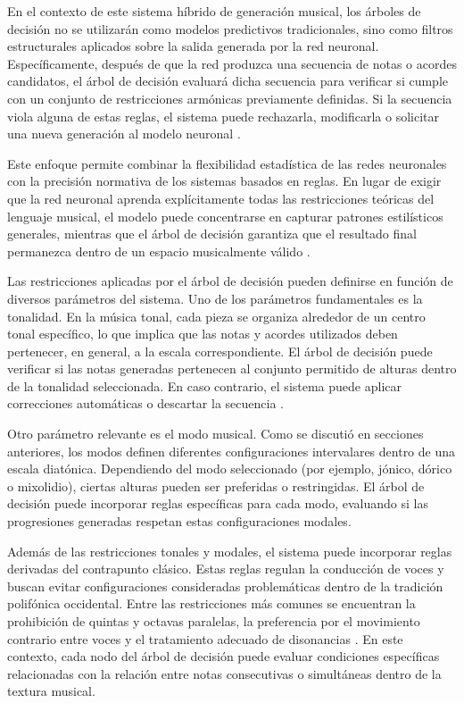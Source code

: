 \documentclass[12pt]{report}
\begin{document}
En el contexto de este sistema híbrido de generación musical, los árboles de decisión no se utilizarán como modelos predictivos tradicionales, sino como filtros estructurales aplicados sobre la salida generada por la red neuronal. Específicamente, después de que la red produzca una secuencia de notas o acordes candidatos, el árbol de decisión evaluará dicha secuencia para verificar si cumple con un conjunto de restricciones armónicas previamente definidas. Si la secuencia viola alguna de estas reglas, el sistema puede rechazarla, modificarla o solicitar una nueva generación al modelo neuronal \cite{pachet2011finite}.

Este enfoque permite combinar la flexibilidad estadística de las redes neuronales con la precisión normativa de los sistemas basados en reglas. En lugar de exigir que la red neuronal aprenda explícitamente todas las restricciones teóricas del lenguaje musical, el modelo puede concentrarse en capturar patrones estilísticos generales, mientras que el árbol de decisión garantiza que el resultado final permanezca dentro de un espacio musicalmente válido \cite{papadopoulos1999ai}.

Las restricciones aplicadas por el árbol de decisión pueden definirse en función de diversos parámetros del sistema. Uno de los parámetros fundamentales es la tonalidad. En la música tonal, cada pieza se organiza alrededor de un centro tonal específico, lo que implica que las notas y acordes utilizados deben pertenecer, en general, a la escala correspondiente. El árbol de decisión puede verificar si las notas generadas pertenecen al conjunto permitido de alturas dentro de la tonalidad seleccionada. En caso contrario, el sistema puede aplicar correcciones automáticas o descartar la secuencia \cite{lerdahl1985generative}.

Otro parámetro relevante es el modo musical. Como se discutió en secciones anteriores, los modos definen diferentes configuraciones intervalares dentro de una escala diatónica. Dependiendo del modo seleccionado (por ejemplo, jónico, dórico o mixolidio), ciertas alturas pueden ser preferidas o restringidas. El árbol de decisión puede incorporar reglas específicas para cada modo, evaluando si las progresiones generadas respetan estas configuraciones modales.

Además de las restricciones tonales y modales, el sistema puede incorporar reglas derivadas del contrapunto clásico. Estas reglas regulan la conducción de voces y buscan evitar configuraciones consideradas problemáticas dentro de la tradición polifónica occidental. Entre las restricciones más comunes se encuentran la prohibición de quintas y octavas paralelas, la preferencia por el movimiento contrario entre voces y el tratamiento adecuado de disonancias \cite{fux1965study}. En este contexto, cada nodo del árbol de decisión puede evaluar condiciones específicas relacionadas con la relación entre notas consecutivas o simultáneas dentro de la textura musical.
\end{document}
